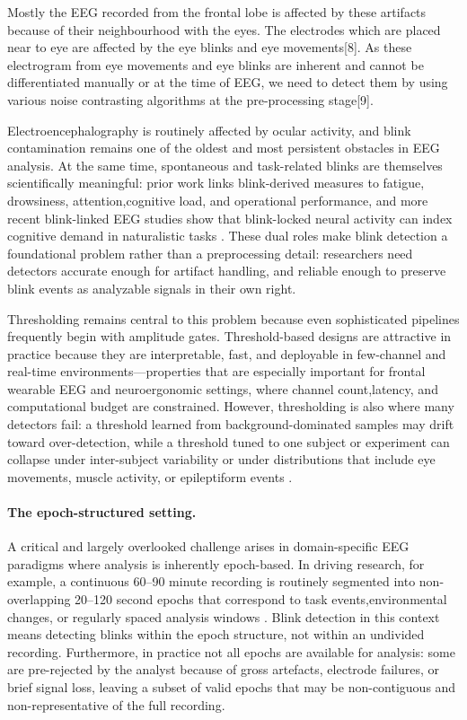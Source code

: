 Mostly the EEG recorded from the frontal lobe is
affected by these artifacts because of their neighbourhood
with the eyes. The electrodes which are placed near to eye
are affected by the eye blinks and eye movements[8]. As
these electrogram from eye movements and eye blinks are
inherent and cannot be differentiated manually or at the time
of EEG, we need to detect  them by using various noise
contrasting algorithms at the pre-processing stage[9].



Electroencephalography is routinely affected by ocular activity, and blink contamination remains one of the oldest and most persistent obstacles in EEG analysis.
At the same time, spontaneous and task-related blinks are themselves scientifically  meaningful: prior work links blink-derived measures to fatigue, drowsiness, attention,cognitive load, and operational performance, and more recent blink-linked EEG studies show that blink-locked neural activity can index cognitive demand in naturalistic tasks
\citep{croft2000removal,kleifges2017blinker,alyan2023blink}.
These dual roles make blink detection a foundational problem rather than a preprocessing detail: researchers need detectors accurate enough for artifact handling, and reliable enough to preserve blink events as analyzable signals in their own right.

Thresholding remains central to this problem because even sophisticated pipelines  frequently begin with amplitude gates.
Threshold-based designs are attractive in practice because they are interpretable, fast, and deployable in few-channel and real-time environments---properties that are especially important for frontal wearable EEG and neuroergonomic settings, where channel count,latency, and computational budget are constrained.
However, thresholding is also where many detectors fail: a threshold learned from background-dominated samples may drift toward over-detection, while a threshold tuned to one subject or experiment can collapse under inter-subject variability or under distributions that include eye movements, muscle activity, or epileptiform events
\citep{chang2016detection,kleifges2017blinker,agarwal2019blink,tran2021detection,wang2022multidimensional,zhang2023method}.

\paragraph{The epoch-structured setting.}
A critical and largely overlooked challenge arises in domain-specific EEG paradigms where analysis is inherently epoch-based.
In driving research, for example, a continuous 60--90 minute recording is routinely segmented into non-overlapping 20--120 second epochs that correspond to task events,environmental changes, or regularly spaced analysis windows
\citep{cao2019multichannel}.
Blink detection in this context means detecting blinks within the epoch structure, not within an undivided recording.
Furthermore, in practice not all epochs are available for analysis: some are pre-rejected by the analyst because of gross artefacts, electrode failures, or brief signal loss, leaving a subset of valid epochs that may be non-contiguous and non-representative of the full recording.

